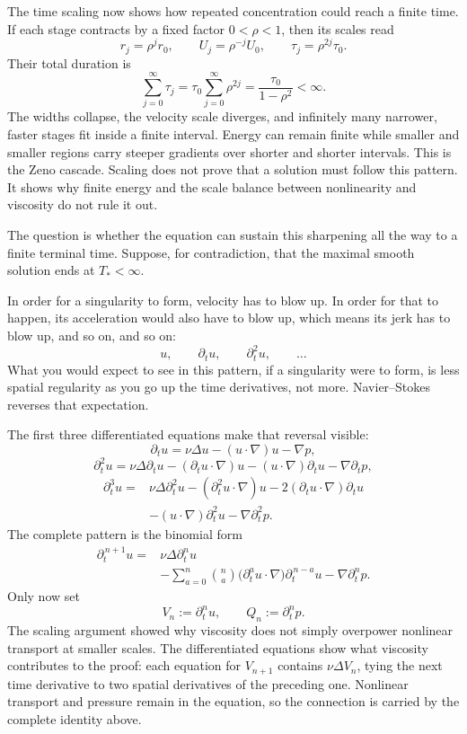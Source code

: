 \documentclass[11pt]{article}
\begin{document}
The time scaling now shows how repeated concentration could reach a finite time. If each stage contracts by a fixed factor \(0<\rho<1\), then its scales read
\[
r_j=\rho^jr_0,
\qquad
U_j=\rho^{-j}U_0,
\qquad
\tau_j=\rho^{2j}\tau_0.
\]
Their total duration is
\[
\sum_{j=0}^{\infty}\tau_j
=\tau_0\sum_{j=0}^{\infty}\rho^{2j}
=\frac{\tau_0}{1-\rho^2}<\infty.
\]
The widths collapse, the velocity scale diverges, and infinitely many narrower, faster stages fit inside a finite interval. Energy can remain finite while smaller and smaller regions carry steeper gradients over shorter and shorter intervals. This is the Zeno cascade. Scaling does not prove that a solution must follow this pattern. It shows why finite energy and the scale balance between nonlinearity and viscosity do not rule it out.

The question is whether the equation can sustain this sharpening all the way to a finite terminal time. Suppose, for contradiction, that the maximal smooth solution ends at \(T_*<\infty\).

In order for a singularity to form, velocity has to blow up. In order for that to happen, its acceleration would also have to blow up, which means its jerk has to blow up, and so on, and so on:
\[
u,\qquad \partial_tu,\qquad \partial_t^2u,\qquad \ldots
\]
What you would expect to see in this pattern, if a singularity were to form, is less spatial regularity as you go up the time derivatives, not more. Navier--Stokes reverses that expectation.

The first three differentiated equations make that reversal visible:
\[
\partial_tu
=\nu\Delta u-(u\cdot\nabla)u-\nabla p,
\]
\[
\partial_t^2u
=\nu\Delta\partial_tu
-(\partial_tu\cdot\nabla)u
-(u\cdot\nabla)\partial_tu
-\nabla\partial_tp,
\]
\[
\begin{aligned}
\partial_t^3u={}&\nu\Delta\partial_t^2u
-(\partial_t^2u\cdot\nabla)u
-2(\partial_tu\cdot\nabla)\partial_tu \\
&-(u\cdot\nabla)\partial_t^2u
-\nabla\partial_t^2p.
\end{aligned}
\]
The complete pattern is the binomial form
\[
\begin{aligned}
\partial_t^{\,n+1}u={}&\nu\Delta\partial_t^n u \\
&-\sum_{a=0}^{n}\binom{n}{a}
\bigl(\partial_t^a u\cdot\nabla\bigr)
\partial_t^{\,n-a}u
-\nabla\partial_t^n p.
\end{aligned}
\]
Only now set
\[
V_n:=\partial_t^n u,
\qquad
Q_n:=\partial_t^n p.
\]
The scaling argument showed why viscosity does not simply overpower nonlinear transport at smaller scales. The differentiated equations show what viscosity contributes to the proof: each equation for \(V_{n+1}\) contains \(\nu\Delta V_n\), tying the next time derivative to two spatial derivatives of the preceding one. Nonlinear transport and pressure remain in the equation, so the connection is carried by the complete identity above.
\end{document}
